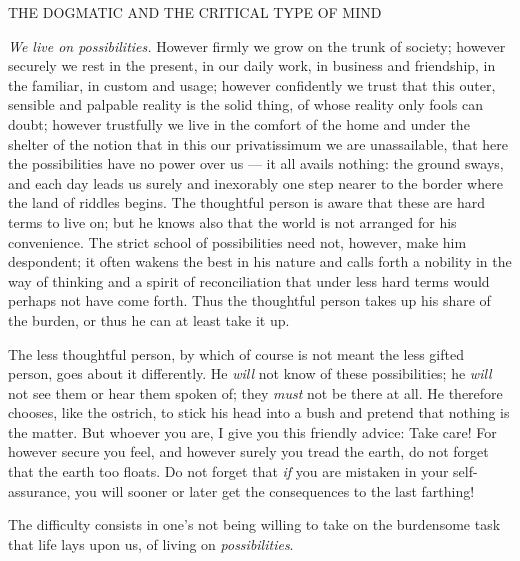\documentclass[12pt,a4paper,openany]{book}
\newcommand{\opage}[1]{\marginnote{\footnotesize\textit{[#1]}}}
\newcommand{\excerpthead}[1]{\par\bigskip\begin{center}#1\end{center}\nopagebreak\smallskip}
\begin{document}
\excerpthead{THE DOGMATIC AND THE CRITICAL TYPE OF MIND}


\emph{We live on possibilities.} However firmly we grow on the trunk of society; however
securely we rest in the present, in our daily work, in business and friendship, in the
familiar, in custom and usage; however confidently we trust that this outer, sensible and
palpable reality is the solid thing, of whose reality only fools can doubt; however
trustfully we live in the comfort of the home and under the shelter of the notion that in
this our privatissimum we are unassailable, that here the possibilities have no power over
us --- it all avails nothing: the ground sways, and each day leads us surely and
inexorably one step nearer to the border where the land of riddles begins. The thoughtful
person is aware that these are hard terms to live on; but
\setcounter{footnote}{0}%
\opage{223}he knows also that the world is not arranged for his convenience.
The strict school of possibilities need not, however, make him despondent; it often
wakens the best in his nature and calls forth a nobility in the way of thinking and a
spirit of reconciliation that under less hard terms would perhaps not have come forth.
Thus the thoughtful person takes up his share of the burden, or thus he can at least
take it up.

The less thoughtful person, by which of course is not meant the less gifted person,
goes about it differently. He \emph{will} not know of these possibilities; he \emph{will}
not see them or hear them spoken of; they \emph{must} not be there at all. He therefore
chooses, like the ostrich, to stick his head into a bush and pretend that nothing is the
matter. But whoever you are, I give you this friendly advice: Take care! For however
secure you feel, and however surely you tread the earth, do not forget that the earth
too floats. Do not forget that \emph{if} you are mistaken in your self-assurance, you
will sooner or later get the consequences to the last farthing!

The difficulty consists in one's not being willing to take on the burdensome task that
life lays upon us, of living on \emph{possibilities}.
\end{document}
